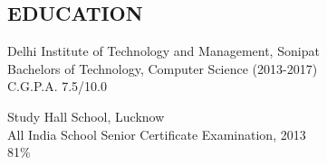 \documentclass[margin]{res}
\begin{document}
  
\address { A-503, Palladium Grand Society, Dhanori, Pune - 411015 (881-6974-354) \\ Email: \href {mailto:divij.sehgaal7@gmail.com}{divij.sehgaal7@gmail.com} |  \href {www.linkedin.com/in/sehgaldivij/}{LinkedIn} | \href {www.github.com/SehgalDivij} {Github}}
\begin{resume}

\section{EDUCATION}       
				Delhi Institute of Technology and Management, Sonipat \\
                Bachelors of Technology, Computer Science (2013-2017) \\
                C.G.P.A. 7.5/10.0

				Study Hall School, Lucknow \\
                All India School Senior Certificate Examination, 2013 \\
                81\%


\end{resume}
\end{document}

